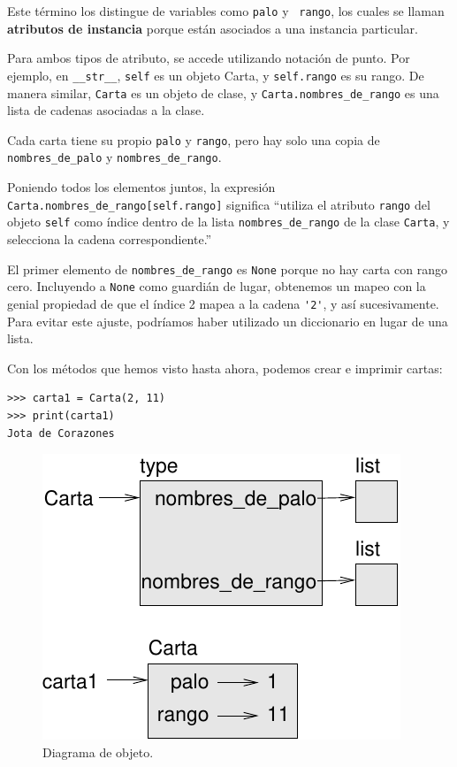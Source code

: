 \documentclass[10pt]{book}
\begin{document}
Este término los distingue de variables como {\tt palo} y {\tt
  rango}, los cuales se llaman {\bf atributos de instancia} porque están
asociados a una instancia particular.

Para ambos tipos de atributo, se accede utilizando notación de punto.  Por
ejemplo, en \verb"__str__", {\tt self} es un objeto Carta,
y {\tt self.rango} es su rango.  De manera similar, {\tt Carta}
es un objeto de clase, y \verb"Carta.nombres_de_rango" es una
lista de cadenas asociadas a la clase.

Cada carta tiene su propio {\tt palo} y {\tt rango}, pero hay
solo una copia de \verb"nombres_de_palo" y \verb"nombres_de_rango".

Poniendo todos los elementos juntos, la expresión
\verb"Carta.nombres_de_rango[self.rango]" significa ``utiliza el atributo {\tt rango}
del objeto {\tt self} como índice dentro de la lista \verb"nombres_de_rango"
de la clase {\tt Carta}, y selecciona la cadena correspondiente.''

El primer elemento de \verb"nombres_de_rango" es {\tt None} porque no
hay carta con rango cero.  Incluyendo a {\tt None} como guardián de lugar,
obtenemos un mapeo con la genial propiedad de que el índice 2 mapea a la
cadena \verb"'2'", y así sucesivamente.  Para evitar este ajuste, podríamos haber
utilizado un diccionario en lugar de una lista.

Con los métodos que hemos visto hasta ahora, podemos crear e imprimir cartas:

\begin{verbatim}
>>> carta1 = Carta(2, 11)
>>> print(carta1)
Jota de Corazones
\end{verbatim}

\begin{figure}
\centerline
{\includegraphics[scale=0.8]{figs/card1.pdf}}
\caption{Diagrama de objeto.}
\label{fig.card1}
\end{figure}
\end{document}
